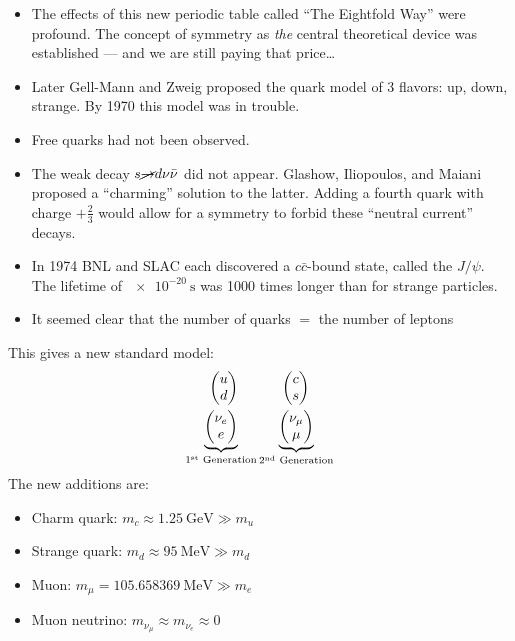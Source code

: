 \begin{itemize}
\item The effects of this new periodic table called ``The Eightfold Way'' were profound. The concept of symmetry as \emph{the} central theoretical device was established --- and we are still paying that price\ldots
\item Later Gell-Mann and Zweig proposed the quark model of 3 flavors: up, down, strange. By 1970 this model was in trouble.
\item Free quarks had not been observed.
\item The weak decay $s\cancel{\to}d\nu\bar{\nu}$ did not appear. Glashow, Iliopoulos, and Maiani proposed a ``charming'' solution to the latter. Adding a fourth quark with charge $+\frac23$ would allow for a symmetry to forbid these ``neutral current'' decays. 
\item In 1974 BNL and SLAC each discovered a $c\bar{c}$-bound state, called the $J/\psi$. The lifetime of $\SI{e-20}{\s}$ was 1000 times longer than for strange particles.
\item It seemed clear that the number of quarks $=$ the number of leptons
\end{itemize}
This gives a new standard model:
\begin{gather*}
  \pmqty{u\\d}\quad\qquad\pmqty{c\\s}\\
  \underbrace{\pmqty{\nu_e\\e}}_{1^{\text{st}}\text{ Generation}}
  \underbrace{\pmqty{\nu_\mu\\\mu}}_{2^{\text{nd}}\text{ Generation}}
\end{gather*}
The new additions are:
\begin{itemize}
\item Charm quark: $m_c\approx\SI{1.25}{\GeV}\gg m_u$
\item Strange quark: $m_d\approx\SI{95}{\MeV}\gg m_d$
\item Muon: $m_\mu=\SI{105.658369}{\MeV}\gg m_e$
\item Muon neutrino: $m_{\nu_\mu}\approx m_{\nu_e}\approx0$
\end{itemize}

